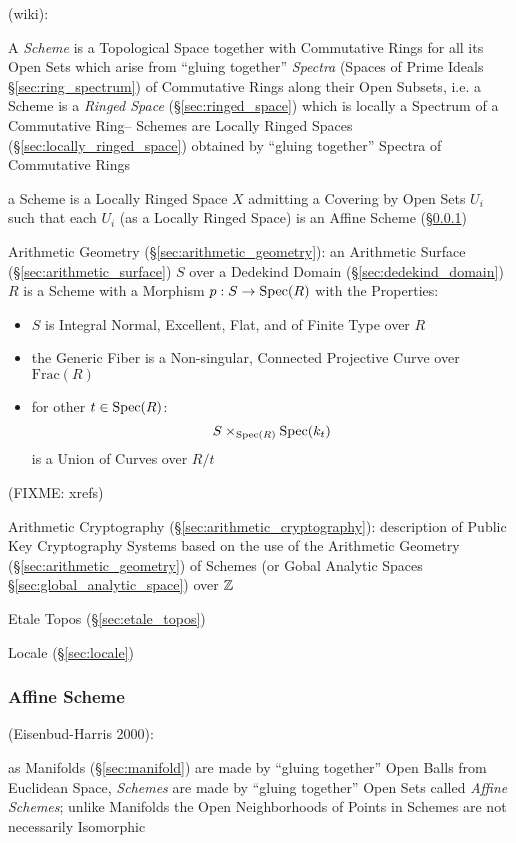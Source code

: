 (wiki):

A \emph{Scheme} is a Topological Space together with Commutative Rings for all
its Open Sets which arise from ``gluing together'' \emph{Spectra} (Spaces of
Prime Ideals \S\ref{sec:ring_spectrum}) of Commutative Rings along their Open
Subsets, i.e. a Scheme is a \emph{Ringed Space} (\S\ref{sec:ringed_space})
which is locally a Spectrum of a Commutative Ring-- Schemes are Locally Ringed
Spaces (\S\ref{sec:locally_ringed_space}) obtained by ``gluing together''
Spectra of Commutative Rings

a Scheme is a Locally Ringed Space $X$ admitting a Covering by Open Sets $U_i$
such that each $U_i$ (as a Locally Ringed Space) is an Affine Scheme
(\S\ref{sec:affine_scheme})

\asterism

\fist Arithmetic Geometry (\S\ref{sec:arithmetic_geometry}): an Arithmetic
Surface (\S\ref{sec:arithmetic_surface}) $S$ over a Dedekind Domain
(\S\ref{sec:dedekind_domain}) $R$ is a Scheme with a Morphism $p : S \rightarrow
\mathrm{Spec}(R)$ with the Properties:
\begin{itemize}
  \item $S$ is Integral Normal, Excellent, Flat, and of Finite Type over $R$
  \item the Generic Fiber is a Non-singular, Connected Projective Curve over
    $\mathrm{Frac}(R)$
  \item for other $t \in \mathrm{Spec}(R)$:
    \[
      S \times_{\mathrm{Spec}(R)} \mathrm{Spec}(k_t)
    \]
    is a Union of Curves over $R / t$
\end{itemize}
(FIXME: xrefs)

\fist Arithmetic Cryptography (\S\ref{sec:arithmetic_cryptography}):
description of Public Key Cryptography Systems based on the use of the
Arithmetic Geometry (\S\ref{sec:arithmetic_geometry}) of Schemes (or Gobal
Analytic Spaces \S\ref{sec:global_analytic_space}) over $\mathbb{Z}$

Etale Topos (\S\ref{sec:etale_topos})

Locale (\S\ref{sec:locale})



\subsubsection{Affine Scheme}\label{sec:affine_scheme}

(Eisenbud-Harris 2000):

as Manifolds (\S\ref{sec:manifold}) are made by ``gluing together'' Open Balls
from Euclidean Space, \emph{Schemes} are made by ``gluing together'' Open Sets
called \emph{Affine Schemes}; unlike Manifolds the Open Neighborhoods of Points
in Schemes are not necessarily Isomorphic

